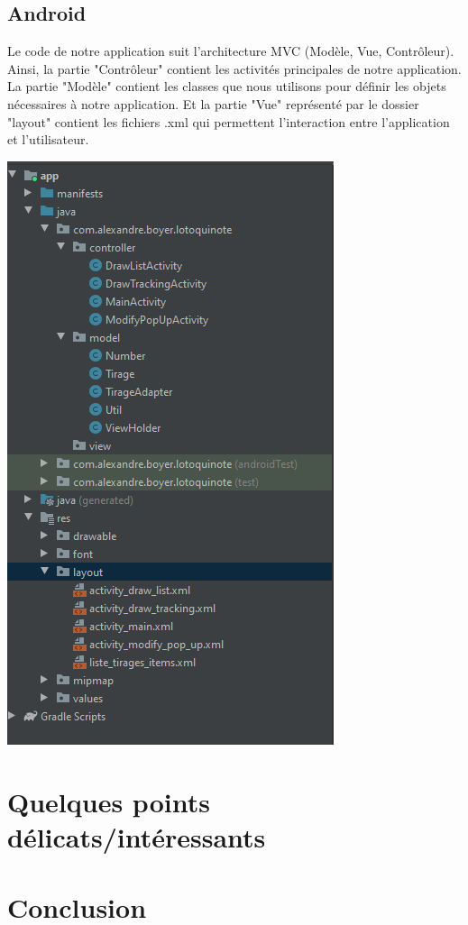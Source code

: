 \documentclass{article}
\begin{document}
\subsection{Android}

    \begin{minipage}{.6\textwidth}%
    Le code de notre application suit l'architecture MVC \newline (Modèle, Vue, Contrôleur).
    \vspace{1em}
    \newline Ainsi, la partie "Contrôleur" contient les activités principales de notre application.
    \vspace{1em}
    \newline La partie "Modèle" contient les classes que nous utilisons pour définir les objets nécessaires à notre application.
    \vspace{1em}
    \newline Et la partie "Vue" représenté par le dossier "layout" contient les fichiers .xml qui permettent l'interaction entre l'application et l'utilisateur. 
    \end{minipage}%
    \hfill
    \begin{minipage}{.35\textwidth}%
        \includegraphics[scale=0.5]{archiMVC.png}
    \end{minipage}%

\section{Quelques points délicats/intéressants}

\section{Conclusion}

\begin{thebibliography}{}
\bibitem{}

\end{thebibliography}
\end{document}
